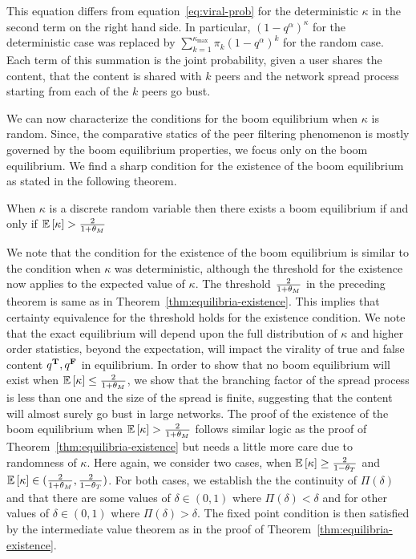 This equation differs from equation~\eqref{eq:viral-prob} for the deterministic $\kappa$ in the second term on the right hand side. In particular, ${\left(1-q^\alpha\right)}^\kappa$ for the deterministic case was replaced by $ \sum_{k=1}^{\kappa_{\max}} \pi_k {\left(1 - q^\alpha\right)}^k $ for the random case. Each term of this summation is the joint probability, given a user shares the content, that the content is shared with $k$ peers and the network spread process starting from each of the $k$ peers go bust. 

We can now characterize the conditions for the boom equilibrium when $\kappa$ is random. Since, the comparative statics of the peer filtering phenomenon is mostly governed by the boom equilibrium properties, we focus only on the boom equilibrium. We find a sharp condition for the existence of the boom equilibrium as stated in the following theorem.

\begin{theorem}\label{thm:non-det-kappa}
    When $\kappa $ is a discrete random variable then there exists a boom equilibrium if and only if  $\mathbb{E}\left[ \kappa\right] > \frac{2 }{1 + \theta_M}$
\end{theorem}

We note that the condition for the existence of the boom equilibrium is similar to the condition when $\kappa$ was deterministic, although the threshold for the existence now applies to the expected value of $\kappa$. The threshold $\frac{2}{1+ \theta_M}$ in the preceding theorem is same as in Theorem~\ref{thm:equilibria-existence}. This implies that certainty equivalence for the threshold holds for the existence condition. We note that the exact equilibrium will depend upon the full distribution of $\kappa$ and higher order statistics, beyond the expectation, will impact the virality of true and false content $q^{\mathbf{T}}, q^{\mathbf{F}}$ in equilibrium. In order to show that no boom equilibrium will exist when $\mathbb{E}\left[ \kappa\right] \leq \frac{2}{1+\theta_M}$, we show that the branching factor of the spread process is less than one and the size of the spread is finite, suggesting that the content will almost surely go bust in large networks. The proof of the existence of the boom equilibrium when $\mathbb{E}\left[ \kappa\right] > \frac{2}{1+\theta_M}$ follows similar logic as the proof of Theorem~\ref{thm:equilibria-existence} but needs a little more care due to randomness of $\kappa$. Here again, we consider two cases, when $\mathbb{E}\left[ \kappa\right] \geq \frac{2}{1-\theta_T}$ and $\mathbb{E}\left[ \kappa\right] \in (\frac{2}{1+\theta_M}, \frac{2}{1-\theta_T})$. For both cases, we establish the the continuity of $\Pi(\delta)$ and that there are some values of $\delta \in (0, 1) $ where $\Pi(\delta) < \delta$ and for other values of $\delta \in (0, 1) $ where $\Pi(\delta) > \delta$. The fixed point condition is then satisfied by the intermediate value theorem as in the proof of Theorem~\ref{thm:equilibria-existence}.

